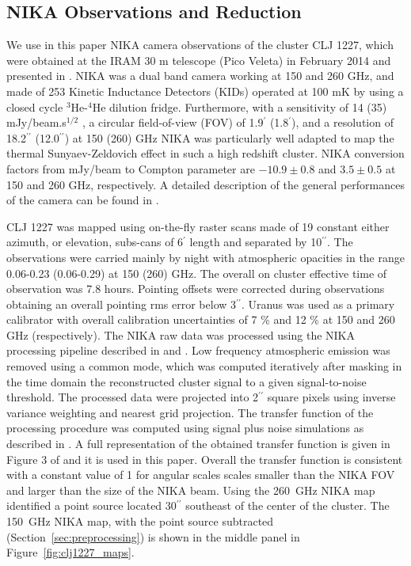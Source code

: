 \documentclass[twocolumn,traditabstract]{aa}
\begin{document}
\subsection{NIKA Observations and Reduction}
\label{sec:nikaobs}
We use in this paper NIKA camera observations of the cluster CLJ 1227, which were obtained at the IRAM 30 m telescope (Pico Veleta) in February 2014 and presented in \citet{adam2015}. NIKA \citep{monfardini2010,monfardini2014} was a dual band camera working at 150 and 260 GHz, and made of 253 Kinetic Inductance Detectors (KIDs) operated at 100 mK by using a closed cycle $^3$He-$^4$He dilution fridge. 
Furthermore, with a sensitivity of 14 (35) mJy/beam.s$^{1/2}$ , a circular field-of-view (FOV) of 1.9$^{\prime}$ (1.8$^{\prime}$), and a resolution of 18.2$^{\prime \prime}$ (12.0$^{\prime \prime}$) at 150 (260) GHz NIKA was particularly well adapted to map the thermal Sunyaev-Zeldovich effect in such a high redshift cluster. NIKA conversion factors from mJy/beam to Compton parameter are $-10.9 \pm 0.8$ and $3.5\pm0.5$ at 150 and 260 GHz, respectively. A detailed description of the general performances of the camera can be found in \citet{catalano2014,adam2014}.

CLJ 1227 was mapped using on-the-fly raster scans made of 19 constant either azimuth, or elevation, subs-cans
of 6$^{\prime}$ length and separated by 10$^{\prime \prime}$. The observations were carried mainly by night with atmospheric opacities in the range 0.06-0.23 (0.06-0.29) at 150 (260) GHz. The overall on cluster effective time of observation was 7.8 hours. Pointing offsets were corrected during observations obtaining an overall pointing rms error below 3$^{\prime \prime}$. Uranus was used as a primary calibrator with overall calibration uncertainties of 7 \% and 12 \% at 150 and 260 GHz (respectively). The NIKA raw data was processed using the NIKA processing pipeline described in \citet{adam14} and \citet{adam15}. Low frequency atmospheric emission was removed using a common mode, which was computed iteratively after masking in the time domain the reconstructed cluster signal to a given signal-to-noise threshold. 
The processed data were projected into 2$^{\prime \prime}$ square pixels using inverse variance weighting and nearest grid projection.
The transfer function of the processing procedure was computed using signal plus noise simulations as described in \citet{adam2015}.
A full representation of the obtained transfer function is given in Figure 3 of \citet{adam2015} and it is used in this paper. Overall the transfer function is consistent with a constant value of 1 for angular scales scales smaller than the NIKA FOV and larger than the size of the NIKA beam. Using the 260~GHz NIKA map \citet{adam2015} identified a point source located 30$^{\prime \prime}$ southeast of the center of the cluster. The 150~GHz NIKA map, with the point source subtracted (Section~\ref{sec:preprocessing}) is shown in the middle panel
in Figure~\ref{fig:clj1227_maps}.
\end{document}
